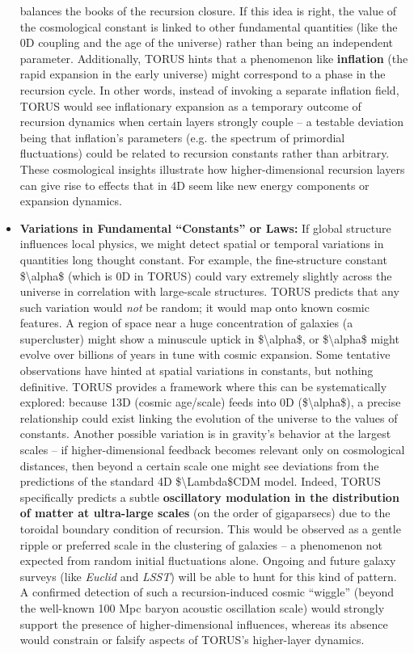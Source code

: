 \documentclass[]{article}
\begin{document}
\begin{itemize}
  balances the books of the recursion closure. If this idea is right,
  the value of the cosmological constant is linked to other fundamental
  quantities (like the 0D coupling and the age of the universe) rather
  than being an independent parameter. Additionally, TORUS hints that a
  phenomenon like \textbf{inflation} (the rapid expansion in the early
  universe) might correspond to a phase in the recursion cycle​. In
  other words, instead of invoking a separate inflation field, TORUS
  would see inflationary expansion as a temporary outcome of recursion
  dynamics when certain layers strongly couple -- a testable deviation
  being that inflation's parameters (e.g. the spectrum of primordial
  fluctuations) could be related to recursion constants rather than
  arbitrary. These cosmological insights illustrate how
  higher-dimensional recursion layers can give rise to effects that in
  4D seem like new energy components or expansion dynamics.
\item
  \textbf{Variations in Fundamental ``Constants'' or Laws:} If global
  structure influences local physics, we might detect spatial or
  temporal variations in quantities long thought constant. For example,
  the fine-structure constant \$\textbackslash{}alpha\$ (which is 0D in
  TORUS) could vary extremely slightly across the universe in
  correlation with large-scale structures. TORUS predicts that any such
  variation would \emph{not} be random; it would map onto known cosmic
  features​. A region of space near a huge concentration of galaxies (a
  supercluster) might show a minuscule uptick in
  \$\textbackslash{}alpha\$, or \$\textbackslash{}alpha\$ might evolve
  over billions of years in tune with cosmic expansion​. Some tentative
  observations have hinted at spatial variations in constants, but
  nothing definitive. TORUS provides a framework where this can be
  systematically explored: because 13D (cosmic age/scale) feeds into 0D
  (\$\textbackslash{}alpha\$), a precise relationship could exist
  linking the evolution of the universe to the values of constants.
  Another possible variation is in gravity's behavior at the largest
  scales -- if higher-dimensional feedback becomes relevant only on
  cosmological distances, then beyond a certain scale one might see
  deviations from the predictions of the standard 4D
  \$\textbackslash{}Lambda\$CDM model. Indeed, TORUS specifically
  predicts a subtle \textbf{oscillatory modulation in the distribution
  of matter at ultra-large scales} (on the order of gigaparsecs) due to
  the toroidal boundary condition of recursion​. This would be observed
  as a gentle ripple or preferred scale in the clustering of galaxies --
  a phenomenon not expected from random initial fluctuations alone.
  Ongoing and future galaxy surveys (like \emph{Euclid} and \emph{LSST})
  will be able to hunt for this kind of pattern​. A confirmed detection
  of such a recursion-induced cosmic ``wiggle'' (beyond the well-known
  100 Mpc baryon acoustic oscillation scale) would strongly support the
  presence of higher-dimensional influences, whereas its absence would
  constrain or falsify aspects of TORUS's higher-layer dynamics.
\end{itemize}
\end{document}
